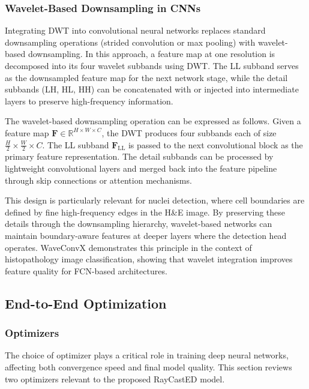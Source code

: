 \subsubsection{Wavelet-Based Downsampling in CNNs}
\label{sec:dwt-cnn}

Integrating DWT into convolutional neural networks replaces standard downsampling operations (strided convolution or max pooling) with wavelet-based downsampling. In this approach, a feature map at one resolution is decomposed into its four wavelet subbands using DWT. The LL subband serves as the downsampled feature map for the next network stage, while the detail subbands (LH, HL, HH) can be concatenated with or injected into intermediate layers to preserve high-frequency information.

The wavelet-based downsampling operation can be expressed as follows. Given a feature map $\mathbf{F} \in \mathbb{R}^{H \times W \times C}$, the DWT produces four subbands each of size $\frac{H}{2} \times \frac{W}{2} \times C$. The LL subband $\mathbf{F}_{\text{LL}}$ is passed to the next convolutional block as the primary feature representation. The detail subbands can be processed by lightweight convolutional layers and merged back into the feature pipeline through skip connections or attention mechanisms.

This design is particularly relevant for nuclei detection, where cell boundaries are defined by fine high-frequency edges in the H\&E image. By preserving these details through the downsampling hierarchy, wavelet-based networks can maintain boundary-aware features at deeper layers where the detection head operates. WaveConvX \cite{zhang2025waveconvx} demonstrates this principle in the context of histopathology image classification, showing that wavelet integration improves feature quality for FCN-based architectures.


\subsection{End-to-End Optimization}
\label{sec:e2e-optimization}

\subsubsection{Optimizers}

The choice of optimizer plays a critical role in training deep neural networks, affecting both convergence speed and final model quality. This section reviews two optimizers relevant to the proposed RayCastED model.

